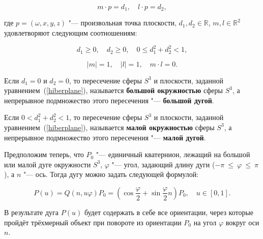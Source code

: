 \begin{equation}
m \cdot p=d_1, \quad l \cdot p=d_2,
\label{hiberplane}
\end{equation}

\noindent где $p=(\omega,x,y,z)$ "--- произвольная точка плоскости, $d_1,d_2 \in \mathbb{R}$, $m,l \in \mathbb{R}^2$
удовлетворяют следующим соотношениям:

$$
d_1 \ge 0, \quad d_2 \ge 0, \quad 0 \le d_1^2+d_2^2<1,
$$

$$
|m|=1, \quad |l|=1, \quad m \cdot l = 0.
$$

\begin{definition}
Если $d_1=0$ и $d_2=0$, то пересечение сферы $S^3$ и плоскости, заданной уравнением~(\ref{hiberplane}), называется
\textbf{большой окружностью} сферы $S^3$, а непрерывное подмножество этого пересечения "--- \textbf{большой дугой}.
\end{definition}

\begin{definition}
Если $0<d_1^2+d_2^2<1$, то пересечение сферы $S^3$ и плоскости, заданной уравнением~(\ref{hiberplane}), называется
\textbf{малой окружностью} сферы $S^3$, а непрерывное подмножество этого пересечения "--- \textbf{малой дугой}.
\end{definition}

Предположим теперь, что $P_0$ "--- единичный кватернион, лежащий на большой или малой дуге окружности $S^3$, $\varphi$
"--- угол, задающий длину дуги ($-\pi~\le~\varphi~\le~\pi$), а $n$ "--- ось. Тогда дугу можно задать следующей
формулой:

$$
P(u)=Q(n,u\varphi)P_0=(\cos\frac{\varphi}{2}+\sin\frac{\varphi}{2}n)P_0, \quad u \in [0,1].
$$

В результате дуга $P(u)$ будет содержать в себе все ориентации, через которые пройдёт трёхмерный объект при повороте
из ориентации $P_0$ на угол $\varphi$ вокруг оси $n$.
